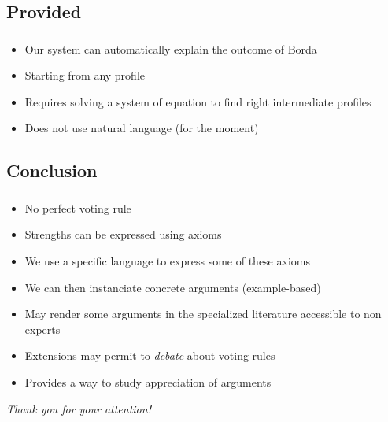 \documentclass[french, english]{beamer}
\begin{document}
\subsection{Provided}
\begin{frame}
	\frametitle{\subsecname}
	\begin{itemize}
		\item Our system can automatically explain the outcome of Borda
		\item Starting from any profile
		\item Requires solving a system of equation to find right intermediate profiles
		\item Does not use natural language (for the moment)
	\end{itemize}
\end{frame}

\subsection{Conclusion}
\begin{frame}
	\frametitle{\subsecname}
	\begin{itemize}
		\item No perfect voting rule
		\item Strengths can be expressed using axioms
		\item We use a specific language to express some of these axioms
		\item We can then instanciate concrete arguments (example-based)
		\item May render some arguments in the specialized literature accessible to non experts
		\item Extensions may permit to \emph{debate} about voting rules
		\item Provides a way to study appreciation of arguments
	\end{itemize}
\end{frame}

\begin{frame}[plain]
	\addtocounter{framenumber}{-1}
	\begin{center}
		\huge
		\textit{Thank you for your attention!}
	\end{center}
\end{frame}

\appendix
\AtBeginSection{
}

\clearpage{}
\begin{frame}
	\frametitle{\refname}
 	
\end{frame}
\end{document}
